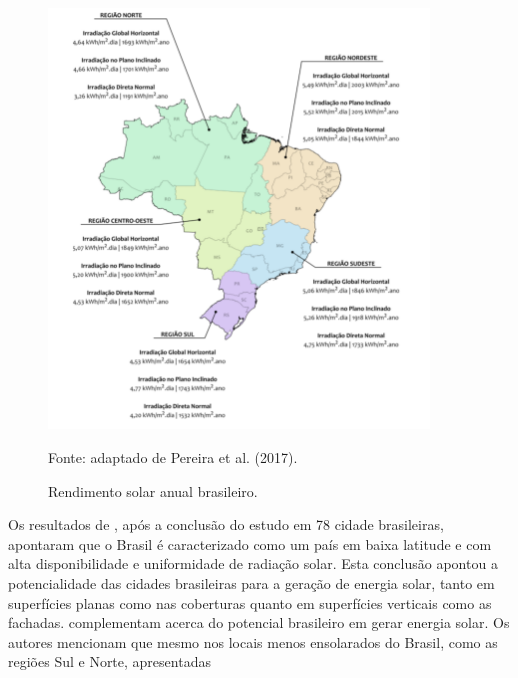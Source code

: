 \begin{onehalfspace}
        \begin{figure}[ht]
            \centering
            \caption{\small Rendimento solar anual brasileiro.}
            \includegraphics[width=0.9\textwidth]{figures/fig3-niveis_de_irradiacao_por_regiao_brasileira_pereira_et_al_2017.png}
                \begin{flushleft}
                    \par \small Fonte: adaptado de Pereira et al. (2017).
                \end{flushleft}
            \label{Figura 2}
        \end{figure}\vspace*{-0.4cm}
    \noindent Os resultados de \textcite{Cronemberger2012}, após a conclusão do estudo em 78 cidade brasileiras, 
    apontaram que o Brasil é caracterizado como um país em baixa latitude e com alta disponibilidade 
    e uniformidade de radiação solar. Esta conclusão apontou a potencialidade das cidades brasileiras 
    para a geração de energia solar, tanto em superfícies planas como nas coberturas quanto em superfícies 
    verticais como as fachadas.\vspace{0.3cm} \newline
    \textcite{Pereira2017} complementam acerca do potencial brasileiro em gerar energia solar. Os autores 
    mencionam que mesmo nos locais menos ensolarados do Brasil, como as regiões Sul e Norte, apresentadas 

\end{onehalfspace}
